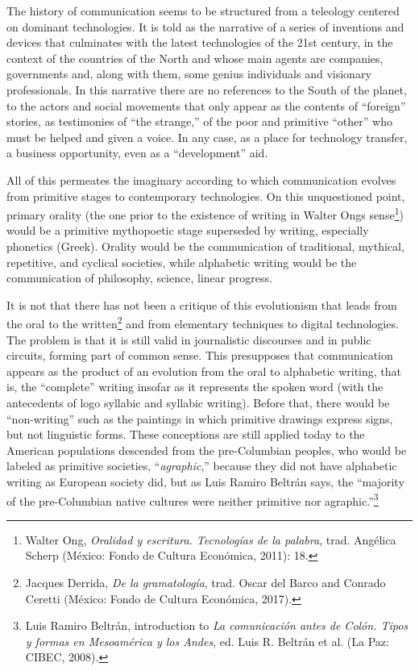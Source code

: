 \documentclass{tufte-handout}
\begin{document}
The history of communication seems to be structured from a teleology
centered on dominant technologies. It is told as the narrative of a
series of inventions and devices that culminates with the latest
technologies of the 21st century, in the context of the countries of the
North and whose main agents are companies, governments and, along with
them, some genius individuals and visionary professionals. In this
narrative there are no references to the South of the planet, to the
actors and social movements that only appear as the contents of
``foreign'' stories, as testimonies of ``the strange,'' of the poor and
primitive ``other'' who must be helped and given a voice. In any case,
as a place for technology transfer, a business opportunity, even as a
``development'' aid.

All of this permeates the imaginary according to which communication
evolves from primitive stages to contemporary technologies. On this
unquestioned point, primary orality (the one prior to the existence of
writing in Walter Ong\textquotesingle s sense\footnote{Walter Ong,
  \emph{Oralidad y escritura. Tecnologías de la palabra}, trad. Angélica
  Scherp (México: Fondo de Cultura Económica, 2011): 18.}) would be a
primitive mythopoetic stage superseded by writing, especially phonetics
(Greek). Orality would be the communication of traditional, mythical,
repetitive, and cyclical societies, while alphabetic writing would be
the communication of philosophy, science, linear progress.

It is not that there has not been a critique of this evolutionism that
leads from the oral to the written\footnote{Jacques Derrida, \emph{De la
  gramatología}, trad. Oscar del Barco and Conrado Ceretti (México:
  Fondo de Cultura Económica, 2017).} and from elementary techniques to
digital technologies. The problem is that it is still valid in
journalistic discourses and in public circuits, forming part of common
sense. This presupposes that communication appears as the product of an
evolution from the oral to alphabetic writing, that is, the ``complete''
writing insofar as it represents the spoken word (with the antecedents
of logo syllabic and syllabic writing). Before that, there would be
``non-writing'' such as the paintings in which primitive drawings
express signs, but not linguistic forms. These conceptions are still
applied today to the American populations descended from the
pre-Columbian peoples, who would be labeled as primitive societies,
``\emph{agraphic},'' because they did not have alphabetic writing as
European society did, but as Luis Ramiro Beltrán says, the ``majority of
the pre-Columbian native cultures were neither primitive nor
agraphic.''\footnote{Luis Ramiro Beltrán, introduction to \emph{La
  comunicación antes de Colón. Tipos y formas en Mesoamérica y los
  Andes}, ed. Luis R. Beltrán et al. (La Paz: CIBEC, 2008).}
\end{document}
